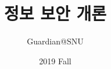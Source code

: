 \documentclass[12pt]{article}
\title{\textbf{정보 보안 개론}}
\author{Guardian@SNU}
\date{2019 Fall}
\begin{document}
\maketitle

\tableofcontents

\pagebreak


\end{document}
